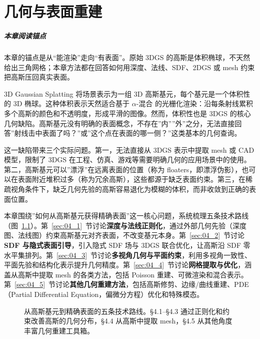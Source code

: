 \chapter{几何与表面重建}
\label{ch:04}

\paragraph*{本章阅读锚点}
本章的锚点是从“能渲染”走向“有表面”。原始 3DGS 的高斯是体积椭球，不天然给出三角网格；本章方法都在回答如何用深度、法线、SDF、2DGS 或 mesh 约束把高斯压回真实表面。


3D Gaussian Splatting 将场景表示为一组 3D 高斯基元，每个基元是一个体积性的 3D 椭球。这种体积表示天然适合基于 $\alpha$-混合 的光栅化渲染：沿每条射线累积多个高斯的颜色和不透明度，形成平滑的图像。然而，体积性也是 3DGS 的核心几何缺陷。高斯基元没有明确的表面概念，不存在”内””外”之分，无法直接回答”射线击中表面了吗？”或”这个点在表面的哪一侧？”这类基本的几何查询。

这一缺陷带来三个实际问题。第一，无法直接从 3DGS 表示中提取 mesh 或 CAD 模型，限制了 3DGS 在工程、仿真、游戏等需要明确几何的应用场景中的使用。第二，高斯基元可以”漂浮”在远离表面的位置（称为 floaters，即漂浮伪影），也可以在表面附近堆积过多（称为冗余高斯），这些都源于缺乏表面约束。第三，在稀疏视角条件下，缺乏几何先验的高斯容易退化为模糊的体积，而非收敛到正确的表面位置。

本章围绕”如何从高斯基元获得精确表面”这一核心问题，系统梳理五条技术路线（图~\ref{fig:04_routes}）。第~\ref{sec:04_1}~节讨论\textbf{深度与法线正则化}，通过外部几何先验（深度图、法线图）约束高斯基元对齐表面，不改变基元本身。第~\ref{sec:04_2}~节讨论\textbf{SDF 与隐式表面引导}，引入隐式 SDF 场与 3DGS 联合优化，让高斯沿 SDF 零水平集排列。第~\ref{sec:04_3}~节讨论\textbf{多视角几何与平面约束}，利用多视角一致性、平面先验和结构化表示提升几何精度。第~\ref{sec:04_4}~节讨论\textbf{网格提取与优化}，涵盖从高斯中提取 mesh 的各类方法，包括 Poisson 重建、可微渲染和混合表示。第~\ref{sec:04_5}~节讨论\textbf{其他几何重建方法}，包括高斯修剪、边缘/曲线重建、PDE（Partial Differential Equation，偏微分方程）优化和特殊模态。

\begin{figure}[htbp]
\centering
\resizebox{0.95\textwidth}{!}{}
\caption{从高斯基元到精确表面的五条技术路线。§4.1--§4.3 通过正则化和约束改善高斯的几何分布，§4.4 从高斯中提取 mesh，§4.5 从其他角度丰富几何重建工具箱。}
\label{fig:04_routes}
\end{figure}


